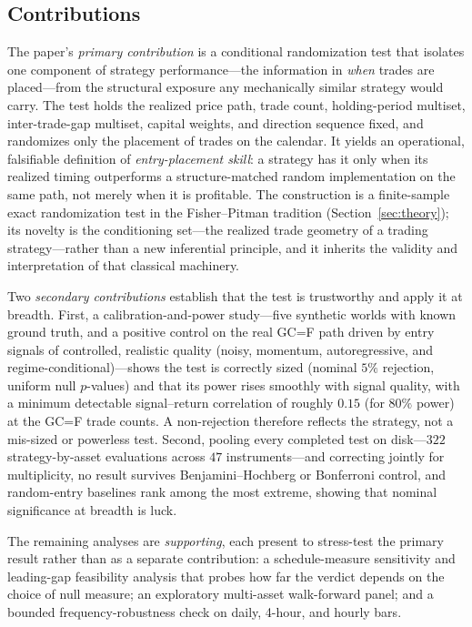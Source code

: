 \documentclass[preprint,12pt]{elsarticle}
\theoremstyle{definition}
\begin{document}
\subsection{Contributions}

The paper's \emph{primary contribution} is a conditional randomization test that isolates one component of strategy performance---the information in \emph{when} trades are placed---from the structural exposure any mechanically similar strategy would carry. The test holds the realized price path, trade count, holding-period multiset, inter-trade-gap multiset, capital weights, and direction sequence fixed, and randomizes only the placement of trades on the calendar. It yields an operational, falsifiable definition of \emph{entry-placement skill}: a strategy has it only when its realized timing outperforms a structure-matched random implementation on the same path, not merely when it is profitable. The construction is a finite-sample exact randomization test in the Fisher--Pitman tradition (Section~\ref{sec:theory}); its novelty is the conditioning set---the realized trade geometry of a trading strategy---rather than a new inferential principle, and it inherits the validity and interpretation of that classical machinery.

Two \emph{secondary contributions} establish that the test is trustworthy and apply it at breadth. First, a calibration-and-power study---five synthetic worlds with known ground truth, and a positive control on the real GC=F path driven by entry signals of controlled, realistic quality (noisy, momentum, autoregressive, and regime-conditional)---shows the test is correctly sized (nominal $5\%$ rejection, uniform null $p$-values) and that its power rises smoothly with signal quality, with a minimum detectable signal--return correlation of roughly $0.15$ (for $80\%$ power) at the GC=F trade counts. A non-rejection therefore reflects the strategy, not a mis-sized or powerless test. Second, pooling every completed test on disk---$322$ strategy-by-asset evaluations across $47$ instruments---and correcting jointly for multiplicity, no result survives Benjamini--Hochberg or Bonferroni control, and random-entry baselines rank among the most extreme, showing that nominal significance at breadth is luck.

The remaining analyses are \emph{supporting}, each present to stress-test the primary result rather than as a separate contribution: a schedule-measure sensitivity and leading-gap feasibility analysis that probes how far the verdict depends on the choice of null measure; an exploratory multi-asset walk-forward panel; and a bounded frequency-robustness check on daily, 4-hour, and hourly bars.
\end{document}
